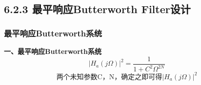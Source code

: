 \documentclass[notheorems,compress,mathserif,table]{beamer}
\begin{document}
\subsection{6.2.3 最平响应Butterworth Filter设计}

\begin{frame}[shrink]\frametitle{最平响应Butterworth系统}%

\textbf{\heiti 一、最平响应Butterworth系统}
$$|H_{a}(j\Omega)|^{2}= \frac{1}{1+C^{2}\Omega^{2N}}$$
$$  \mbox{两个未知参数C，N，确定之即可得$|H_{a}(j\Omega)|^{2}$} $$
\end{frame}


\end{document}
